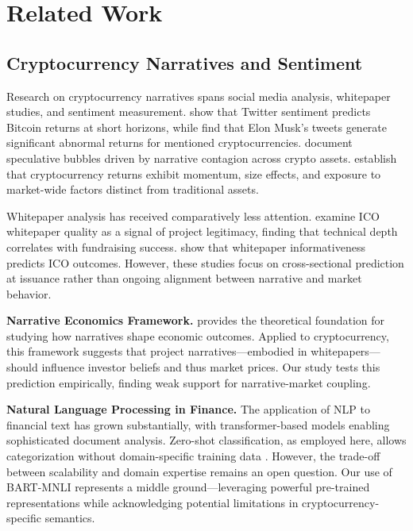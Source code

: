 \documentclass[11pt,twocolumn]{article}
\begin{document}
\section{Related Work}
\label{sec:literature}

\subsection{Cryptocurrency Narratives and Sentiment}

Research on cryptocurrency narratives spans social media analysis, whitepaper studies, and sentiment measurement. \citet{chen2019bitcoin} show that Twitter sentiment predicts Bitcoin returns at short horizons, while \citet{ante2023tweet} find that Elon Musk's tweets generate significant abnormal returns for mentioned cryptocurrencies. \citet{grobys2021speculation} document speculative bubbles driven by narrative contagion across crypto assets. \citet{liu2021risks} establish that cryptocurrency returns exhibit momentum, size effects, and exposure to market-wide factors distinct from traditional assets.

Whitepaper analysis has received comparatively less attention. \citet{howell2020initial} examine ICO whitepaper quality as a signal of project legitimacy, finding that technical depth correlates with fundraising success. \citet{fisch2019initial} show that whitepaper informativeness predicts ICO outcomes. However, these studies focus on cross-sectional prediction at issuance rather than ongoing alignment between narrative and market behavior.

\textbf{Narrative Economics Framework.} \citet{shiller2017narrative} provides the theoretical foundation for studying how narratives shape economic outcomes. Applied to cryptocurrency, this framework suggests that project narratives---embodied in whitepapers---should influence investor beliefs and thus market prices. Our study tests this prediction empirically, finding weak support for narrative-market coupling.

\textbf{Natural Language Processing in Finance.} The application of NLP to financial text has grown substantially, with transformer-based models enabling sophisticated document analysis. Zero-shot classification, as employed here, allows categorization without domain-specific training data \citep{lewis2020bart}. However, the trade-off between scalability and domain expertise remains an open question. Our use of BART-MNLI represents a middle ground---leveraging powerful pre-trained representations while acknowledging potential limitations in cryptocurrency-specific semantics.
\end{document}

